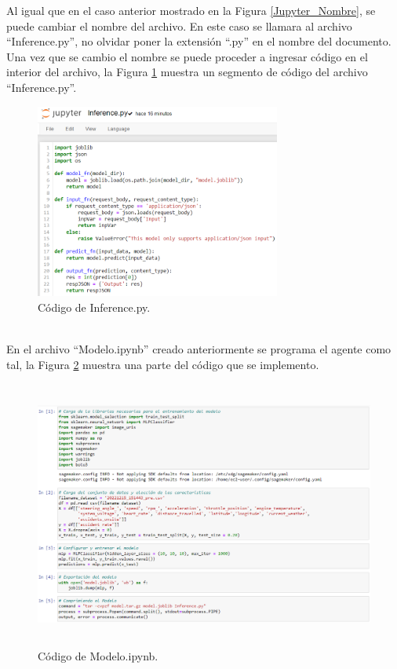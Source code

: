 \documentclass[a4paper,10pt, oneside, titlepage]{article}
\begin{document}
	\indent Al igual que en el caso anterior mostrado en la Figura \ref{Jupyter_Nombre}, se puede cambiar el nombre del archivo. En este caso se llamara al archivo ``Inference.py'', no olvidar poner la extensión ``.py'' en el nombre del documento. Una vez que se cambio el nombre se puede proceder a ingresar código en el interior del archivo, la Figura \ref{Inference_Codigo} muestra un segmento de código del archivo ``Inference.py''.
	\begin{figure}[!h]
		\centering
		\includegraphics[width = 1\linewidth, height = 6.4cm]{Inference_Codigo.png}
		\caption{Código de Inference.py.}
		\label{Inference_Codigo}
	\end{figure} \\
	\indent En el archivo ``Modelo.ipynb'' creado anteriormente se programa el agente como tal, la Figura \ref{Modelo_Codigo} muestra una parte del código que se implemento.
	\begin{figure}[!h]
		\centering
		\includegraphics[width = 1\linewidth, height = 8.8cm]{Modelo_Codigo.png}
		\caption{Código de Modelo.ipynb.}
		\label{Modelo_Codigo}
	\end{figure} \\
\end{document}
